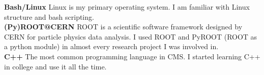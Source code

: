 \documentclass[10pt]{article} %
\begin{document}
\textbf{Bash/Linux}
\small{
Linux is my primary operating system. I am familiar with Linux structure and bash scripting.
}\\


\textbf{(Py)ROOT@CERN}
\small{
ROOT is a scientific software framework designed by CERN for particle physics data analysis. I used ROOT and PyROOT (ROOT as a python module) in almost every research project I was involved in.
}\\


\textbf{C++}
\small{
The most common programming language in CMS. I started learning C++ in college and use it all the time.
}
\end{document}
